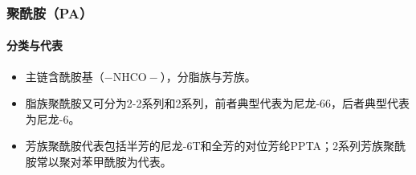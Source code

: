 ﻿\documentclass[12pt,a4paper]{article}
\begin{document}
\subsubsection{聚酰胺（PA）}
\paragraph{分类与代表}
\begin{itemize}
  \item 主链含酰胺基（$-\mathrm{NHCO}-$），分脂族与芳族。
  \item 脂族聚酰胺又可分为2-2系列和2系列，前者典型代表为尼龙-66，后者典型代表为尼龙-6。
  \item 芳族聚酰胺代表包括半芳的尼龙-6T和全芳的对位芳纶PPTA；2系列芳族聚酰胺常以聚对苯甲酰胺为代表。
\end{itemize}
\end{document}
